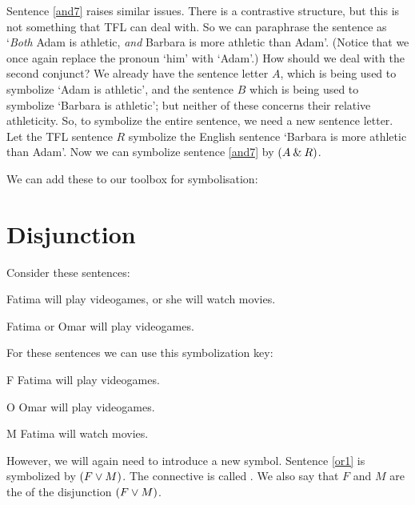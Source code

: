 Sentence \ref{and7} raises similar issues. There is a contrastive structure, but this is not something that TFL can deal with. So we can paraphrase the sentence as `\emph{Both} Adam is athletic, \emph{and} Barbara is more athletic than Adam'. (Notice that we once again replace the pronoun `him' with `Adam'.) How should we deal with the second conjunct? We already have the sentence letter $A$, which is being used to symbolize `Adam is athletic', and the sentence $B$ which is being used to symbolize `Barbara is athletic'; but neither of these concerns their relative athleticity. So, to symbolize the entire sentence, we need a new sentence letter. Let the TFL sentence $R$ symbolize the English sentence `Barbara is more athletic than Adam'. Now we can symbolize sentence \ref{and7} by $(A \mathbin{\&} R)$.

We can add these to our toolbox for symbolisation:



\section{Disjunction}

Consider these sentences:
	\begin{earg}
		\item[\ex{or1}] Fatima will play videogames, or she will watch movies.
		\item[\ex{or2}] Fatima or Omar will play videogames.
	\end{earg}
For these sentences we can use this symbolization key:
	\begin{ekey}
		\item[F] Fatima will play videogames.
		\item[O] Omar will play videogames.
		\item[M] Fatima will watch movies.
	\end{ekey}
However, we will again need to introduce a new symbol. Sentence \ref{or1} is symbolized by $(F \vee M)$. The connective is called . We also say that $F$ and $M$ are the  of the disjunction $(F \vee M)$.

